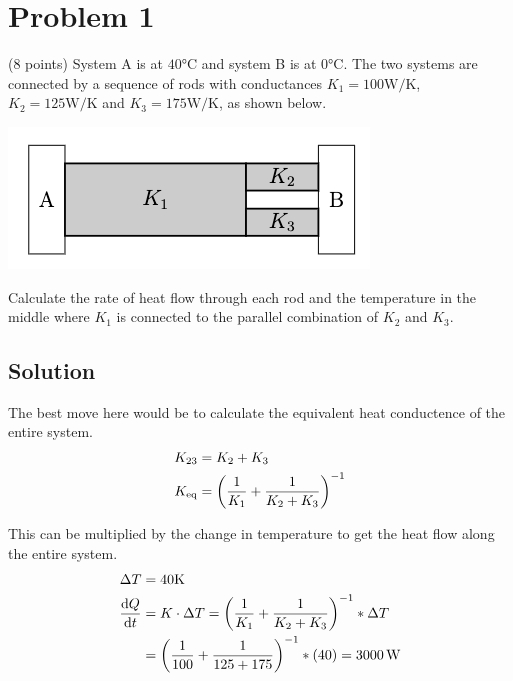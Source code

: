 \documentclass[12pt]{article}
\begin{document}
    \section{Problem 1}
        (8 points) System A is at $40\unit{\celsius}$ and system B is at $0\unit{\celsius}$. 
        The two systems are connected by a sequence of rods with conductances $K_1 = 100 \unit{\watt/\kelvin}$, $K_2 = 125 \unit{\watt/\kelvin}$ and $K_3 = 175 \unit{\watt/\kelvin}$, as shown below.
        \begin{center}
            \includegraphics{picture_1.png}
        \end{center}

        Calculate the rate of heat ﬂow through each rod and the temperature in the middle where $K_1$ is connected to the parallel combination of $K_2$ and $K_3$.

        \subsection{Solution}
            The best move here would be to calculate the equivalent heat conductence of the entire system.
            \begin{align}
                K_{23}  &=  K_2 + K_3\\
                K_{\rm eq}  &=  \left( \frac{1}{K_1} + \frac{1}{K_2 + K_3} \right)^{-1}
            \end{align}

            This can be multiplied by the change in temperature to get the heat flow along the entire system.
            \begin{align}
                \Delta T    &=  40\unit{\kelvin}\\
                \dv{Q}{t}   &=  K \cdot \Delta T
                    =   \left( \frac{1}{K_1} + \frac{1}{K_2 + K_3} \right)^{-1} * \Delta T\\
                    &=  \left( \frac{1}{100} + \frac{1}{125 + 175} \right)^{-1} * (40)
                    =   3000\,\unit{\watt}
            \end{align}
\end{document}

